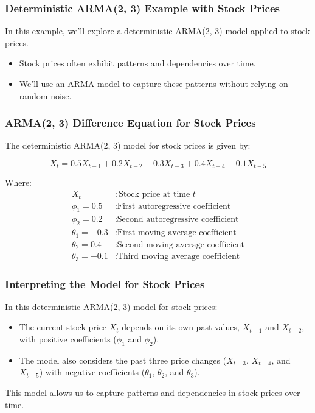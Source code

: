 \begin{frame}
	\frametitle{Deterministic ARMA(2, 3) Example with Stock Prices}
	
	In this example, we'll explore a deterministic ARMA(2, 3) model applied to stock prices.
	
	\begin{itemize}
		\item Stock prices often exhibit patterns and dependencies over time.
		\item We'll use an ARMA model to capture these patterns without relying on random noise.
	\end{itemize}
	
\end{frame}

\begin{frame}
	\frametitle{ARMA(2, 3) Difference Equation for Stock Prices}
	
	The deterministic ARMA(2, 3) model for stock prices is given by:
	
	\[
	X_t = 0.5 X_{t-1} + 0.2 X_{t-2} - 0.3 X_{t-3} + 0.4 X_{t-4} - 0.1 X_{t-5}
	\]
	
	Where:
	\begin{align*}
	X_t & : \text{Stock price at time } t \\
	\phi_1 = 0.5 & : \text{First autoregressive coefficient} \\
	\phi_2 = 0.2 & : \text{Second autoregressive coefficient} \\
	\theta_1 = -0.3 & : \text{First moving average coefficient} \\
	\theta_2 = 0.4 & : \text{Second moving average coefficient} \\
	\theta_3 = -0.1 & : \text{Third moving average coefficient}
	\end{align*}
	
\end{frame}

\begin{frame}
	\frametitle{Interpreting the Model for Stock Prices}
	
	In this deterministic ARMA(2, 3) model for stock prices:
	\begin{itemize}
		\item The current stock price $X_t$ depends on its own past values, $X_{t-1}$ and $X_{t-2}$, with positive coefficients ($\phi_1$ and $\phi_2$).
		\item The model also considers the past three price changes ($X_{t-3}$, $X_{t-4}$, and $X_{t-5}$) with negative coefficients ($\theta_1$, $\theta_2$, and $\theta_3$).
	\end{itemize}
	
	This model allows us to capture patterns and dependencies in stock prices over time.
	
\end{frame}

